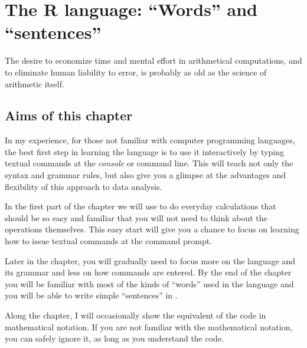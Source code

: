 \documentclass[krantz2]{krantz}\usepackage{knitr}
\begin{document}



\chapter{The R language: ``Words'' and ``sentences''}\label{chap:R:as:calc}

\begin{VF}
The desire to economize time and mental effort in arithmetical computations, and to eliminate human liability to error, is probably as old as the science of arithmetic itself.

\nocite{Aiken1964}
\end{VF}


\section{Aims of this chapter}

In my experience, for those not familiar with computer programming languages, the best first step in learning the \Rlang language is to use it interactively by typing textual commands at the \emph{console} or command line. This will teach not only the syntax and grammar rules, but also give you a glimpse at the advantages and flexibility of this approach to data analysis.

In the first part of the chapter we will use \Rlang to do everyday calculations that should be so easy and familiar that you will not need to think about the operations themselves. This easy start will give you a chance to focus on learning how to issue textual commands at the command prompt.

Later in the chapter, you will gradually need to focus more on the \Rlang language and its grammar and less on how commands are entered. By the end of the chapter you will be familiar with most of the kinds of ``words'' used in the \Rlang language and you will be able to write simple ``sentences'' in \Rlang.

Along the chapter, I will occasionally show the equivalent of the \Rlang code in mathematical notation. If you are not familiar with the mathematical notation, you can safely ignore it, as long as you understand the \Rlang code.
\end{document}
